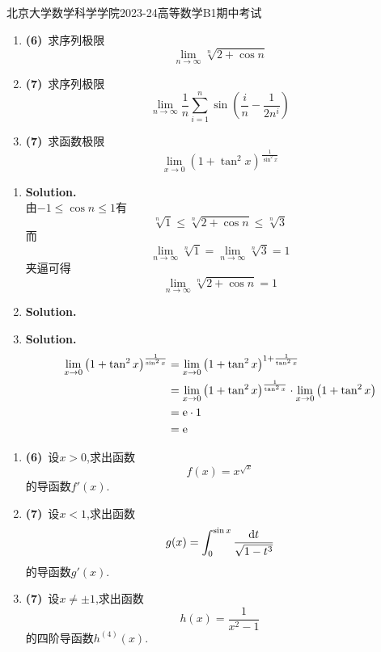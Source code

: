 \documentclass{ctexart}
\begin{document}
\pagestyle{empty}
\begin{center}\Large
    北京大学数学科学学院2023-24高等数学B1期中考试
\end{center}
\begin{problem}[1.(20\songti{分})]
    \begin{enumerate}[label=\textbf{(\arabic*)},leftmargin=*]
        \item \textbf{(6)}\ 求序列极限$$\lim_{n\to\infty}{\sqrt[n]{2+\cos n}}$$
        \item \textbf{(7)}\ 求序列极限$$\lim_{n\to\infty}{\dfrac{1}{n}\sum_{i=1}^{n}{\sin\left(\dfrac{i}{n}-\dfrac{1}{2n^i}\right)}}$$
        \item \textbf{(7)}\ 求函数极限$$\lim_{x\to0}{\left(1+\tan^2 x\right)^{\frac{1}{\sin^2 x}}}$$
    \end{enumerate}
\end{problem}
\begin{solution}[Solution.]
    \begin{enumerate}[label=\textbf{(\arabic*)},leftmargin=*]
        \item \textbf{Solution.}\\
            由$-1\leqslant \cos n\leqslant 1$有
            $$\sqrt[n]{1}\leqslant\sqrt[n]{2+\cos n}\leqslant\sqrt[n]{3}$$
            而$$\lim_{n\to\infty}{\sqrt[n]{1}}=\lim_{n\to\infty}{\sqrt[n]{3}}=1$$
            夹逼可得$$\lim_{n\to\infty}{\sqrt[n]{2+\cos n}}=1$$
        \item \textbf{Solution.}\\
        \item \textbf{Solution.}
            \begin{align*}
                \lim_{x\to0}{\left(1+\tan^2 x\right)^{\frac{1}{\sin^2 x}}}
                &= \lim_{x\to0}{\left(1+\tan^2 x\right)^{1+\frac{1}{\tan^2 x}}} \\
                &= \lim_{x\to0}{\left(1+\tan^2 x\right)^{\frac{1}{\tan^2 x}}}\cdot\lim_{x\to0}{\left(1+\tan^2 x\right)} \\
                &= \mathrm{e}\cdot 1 \\
                &= \mathrm{e}
            \end{align*}
    \end{enumerate}
\end{solution}
\begin{problem}[2.(20\songti{分})]
    \begin{enumerate}[label=\textbf{(\arabic*)},leftmargin=*]
        \item \textbf{(6)}\ 设$x>0$,求出函数$$f(x)=x^{\sqrt{x}}$$的导函数$f'(x)$.
        \item \textbf{(7)}\ 设$x<1$,求出函数$$g(x)=\int_0^{\sin x}\dfrac{\mathrm{d} t}{\sqrt{1-t^3}}$$的导函数$g'(x)$.
        \item \textbf{(7)}\ 设$x\neq\pm 1$,求出函数$$h(x)=\dfrac{1}{x^2-1}$$的四阶导函数$h^{(4)}(x)$.
    \end{enumerate}
\end{problem}
\end{document}
